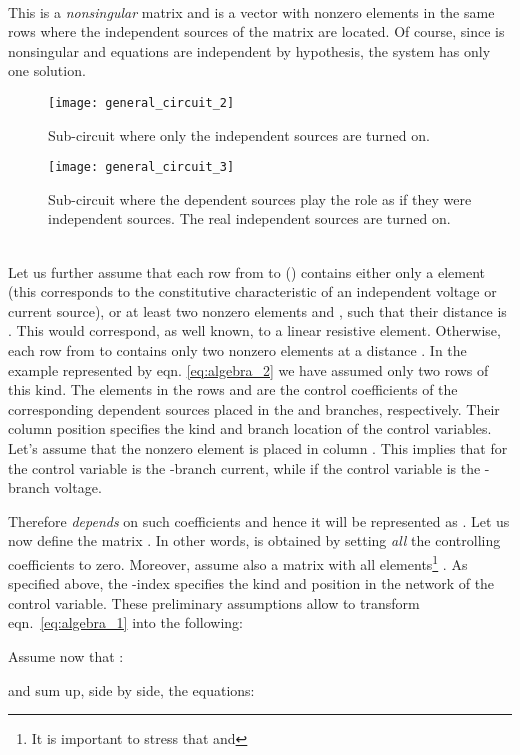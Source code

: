 \documentclass[10pt]{amsart}
\begin{document}
\\
This is a \emph{nonsingular}  matrix and  is a  vector with nonzero elements in the same rows where the independent sources of the  matrix are located. Of course, since  is nonsingular and equations are independent by hypothesis, the system has only one solution. \\
\begin{figure}[hb]
\centering
\texttt{[image: general\_circuit\_2]}
\caption{Sub-circuit where only the independent sources are turned on.}
\label{fig:general_circuit_2}
\end{figure}
\begin{figure}[hb]
\centering
\texttt{[image: general\_circuit\_3]}
\caption{Sub-circuit where the dependent sources play the role as if they were independent sources. The real independent sources are turned on.}
\label{fig:general_circuit_3}
\end{figure}
\\
Let us further assume that each row from  to  () contains either only a  element (this corresponds to the constitutive characteristic of an independent voltage or current source), or at least two nonzero elements  and ,  such that their distance is . This would correspond, as well known, to a linear resistive element. Otherwise, each row from  to  contains only two nonzero elements at a distance . In the example represented by eqn. \eqref{eq:algebra_2} we have assumed only two rows of this kind. The elements  in the rows  and  are the control coefficients of the corresponding dependent sources placed in the  and  branches, respectively. Their column position specifies the kind and branch location of the control variables. Let's assume that the nonzero element is placed in column . This implies that for  the control variable is the -branch current, while if  the control variable is the -branch voltage.

Therefore  \emph{depends} on such coefficients and hence it will be represented as .
Let us now define the matrix . In other words,  is obtained by setting \emph{all} the controlling coefficients  to zero. Moreover, assume also  a  matrix with all elements\footnote{It is important to stress that  and } . As specified above, the -index specifies the kind and position in the network of the control variable. These preliminary assumptions allow to transform eqn.~\eqref{eq:algebra_1} into the following:


Assume now that :


and sum up, side by side, the equations:
\end{document}
